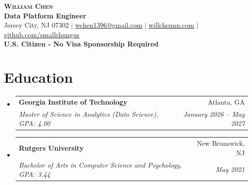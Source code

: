 \documentclass[letterpaper,10pt]{article}
\makeatletter
\newcommand{\resumeSubheading}[4]{
  \vspace{-2pt}\item
    \begin{tabular*}{0.97\textwidth}[t]{l@{\extracolsep{\fill}}r}
      \textbf{#1} & #2 \\
      \textit{\small#3} & \textit{\small #4} \\
    \end{tabular*}\vspace{-7pt}
}
\newcommand{\resumeSubHeadingListStart}{\begin{itemize}[leftmargin=0.15in, label={}]}
\newcommand{\resumeSubHeadingListEnd}{\end{itemize}}
\makeatother
\begin{document}
\begin{center}
    \textbf{\Huge \scshape William Chen} \\ \vspace{2pt}
    \textbf{Data Platform Engineer} \\ \vspace{2pt}
    \small Jersey City, NJ 07302 $|$ \href{mailto:wchen1396@gmail.com}{\underline{wchen1396@gmail.com}} $|$ \href{https://willchennn.com}{\underline{willchennn.com}} $|$ \href{https://github.com/smallchungus/}{\underline{github.com/smallchungus}} \\
    \vspace{1pt}
    \small \textbf{U.S. Citizen - No Visa Sponsorship Required}
\end{center}
\section{Education}
  \resumeSubHeadingListStart
    \resumeSubheading
      {Georgia Institute of Technology}{Atlanta, GA}
      {Master of Science in Analytics (Data Science), GPA: 4.00}{January 2026 -- May 2027}
    \resumeSubheading
      {Rutgers University}{New Brunswick, NJ}
      {Bachelor of Arts in Computer Science and Psychology, GPA: 3.44}{May 2021}
  \resumeSubHeadingListEnd
\end{document}
